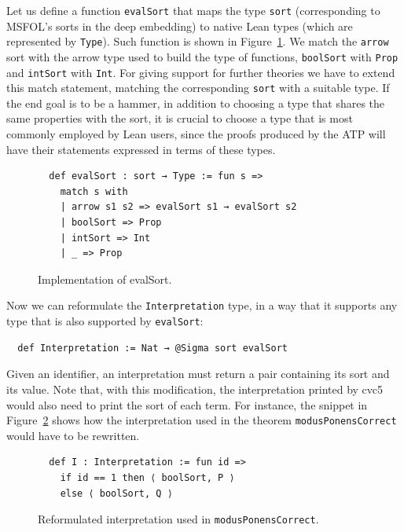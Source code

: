 Let us define a function \texttt{evalSort} that maps the type \texttt{sort}
(corresponding to MSFOL's sorts in the deep embedding) to native Lean types
(which are represented by \texttt{Type}). Such function is shown in Figure~\ref{impEvalSort}.
We match the \texttt{arrow} sort with the arrow type used to build the type of
functions, \texttt{boolSort} with \texttt{Prop} and \texttt{intSort} with \texttt{Int}.
For giving support for further theories we have to extend this match statement,
matching the corresponding \texttt{sort} with a suitable type.
If the end goal is to be a hammer, in addition to choosing a type that shares the
same properties with the sort, it is crucial to choose a type that is most commonly
employed by Lean users, since the proofs produced by the ATP will have their
statements expressed in terms of these types.

\begin{figure}[t]
\begin{verbatim}
  def evalSort : sort → Type := fun s =>
    match s with
    | arrow s1 s2 => evalSort s1 → evalSort s2
    | boolSort => Prop
    | intSort => Int
    | _ => Prop
\end{verbatim}
\caption{Implementation of evalSort.}\label{impEvalSort}
\end{figure}

Now we can reformulate the \texttt{Interpretation} type, in a way that
it supports any type that is also supported by \texttt{evalSort}:

\begin{verbatim}
  def Interpretation := Nat → @Sigma sort evalSort
\end{verbatim}

Given an identifier, an interpretation must return a pair containing its sort
and its value. Note that, with this modification, the interpretation printed
by cvc5 would also need to print the sort of each term. For instance,
the snippet in Figure~\ref{fig:new_interp} shows how the interpretation
used in the theorem \texttt{modusPonensCorrect} would have to be rewritten.

\begin{figure}[t]
\begin{verbatim}
  def I : Interpretation := fun id =>
    if id == 1 then ⟨ boolSort, P ⟩
    else ⟨ boolSort, Q ⟩
\end{verbatim}
\caption{Reformulated interpretation used in \texttt{modusPonensCorrect}.}\label{fig:new_interp}
\end{figure}

